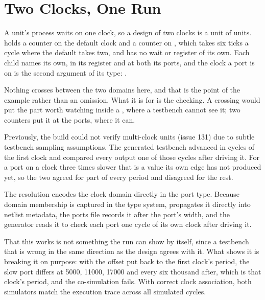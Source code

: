 \section{Two Clocks, One Run}
\label{sec:x-twoclock}

A unit's process waits on one clock, so a design of two clocks is a
unit of units.  holds a counter on the default clock and a
counter on , which takes six ticks a cycle where the
default takes two, and has no wait or register of its own. Each child names its
own, in its register and at both its ports, and the clock a port is
on is the second argument of its type: .

Nothing crosses between the two domains here, and that is the point of
the example rather than an omission. What it is for is the checking.
A crossing would put the part worth watching inside a ,
where a testbench cannot see it; two counters put it at the ports,
where it can.



Previously, the build could not verify multi-clock units (issue 131)
due to subtle testbench sampling assumptions. The generated testbench
advanced in cycles of the first clock and compared every output one of
those cycles after driving it. For a port on a clock three times
slower that is a value its own edge has not produced yet, so the two
agreed for part of every period and disagreed for the rest.

The resolution encodes the clock domain directly in the port type. Because
domain membership is captured in the type system, \code{\#[lower]}
propagates it directly into netlist metadata, the ports file records it after
the port's width, and the generator reads it to check each port one
cycle of its own clock after driving it.

That this works is not something the run can show by itself, since a
testbench that is wrong in the same direction as the design agrees
with it. What shows it is breaking it on purpose: with the offset put
back to the first clock's period, the slow port differs at 5000,
11000, 17000 and every six thousand after, which is that clock's
period, and the co-simulation fails. With correct clock association,
both simulators match the execution trace across all simulated cycles.

